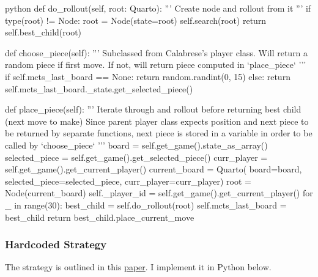 \begin{mintedbox}{python}
    def do_rollout(self, root: Quarto):
        '''
        Create node and rollout from it
        '''
        if type(root) != Node:
            root = Node(state=root)
        self.search(root)
        return self.best_child(root)

    def choose_piece(self):
        '''
        Subclassed from Calabrese's player class. Will return a random piece if first move. If not, will return piece computed in `place_piece`
        '''
        if self.mcts_last_board == None:
            return random.randint(0, 15)
        else:
            return self.mcts_last_board._state.get_selected_piece()

    def place_piece(self):
        '''
        Iterate through and rollout before returning best child (next move to make)
        Since parent player class expects position and next piece to be
        returned by separate functions, next piece is stored in a variable in order to be called by `choose_piece`
        '''
        board = self.get_game().state_as_array()
        selected_piece = self.get_game().get_selected_piece()
        curr_player = self.get_game().get_current_player()
        current_board = Quarto(
            board=board, selected_piece=selected_piece, curr_player=curr_player)
        root = Node(current_board)
        self._player_id = self.get_game().get_current_player()
        for _ in range(30):
            best_child = self.do_rollout(root)
        self.mcts_last_board = best_child
        return best_child.place_current_move

\end{mintedbox}

\subsubsection{Hardcoded Strategy}

The strategy is outlined in this \href{https://scholarworks.umt.edu/cgi/viewcontent.cgi?article=1334&context=tme}{paper}. I implement it in Python below.

